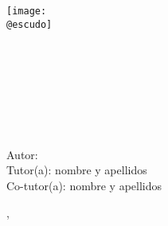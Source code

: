 \begin{titlepage}
    \makeatletter
	\begin{center}
        \vspace{1cm}
		\texttt{[image: \\@escudo]}\vspace{1cm}
		
		{\LARGE \textbf{\@instEdu \\[0.5ex]
				\@centroEdu}}\\[0.5cm]
		{\Large \textbf{\@depto}}\\ [1cm]%
		{\large \textbf{\@especialidad}}\\[1.5cm]
		{\LARGE \textbf{\@tipoDoc}}\\[1cm]
		
		{\LARGE \textbf{\@tituloPrimera}}\\ \smallskip%
		\ifdefined\@tituloSegunda{\LARGE \textbf{\@tituloSegunda}}
		\else \phantom{\LARGE Texto fantasma}
		\fi
	\end{center}
	\vfill%
	\begin{flushleft}
		{\Large Autor: \@autor} \\ \bigskip%
		{\Large Tutor(a): nombre y apellidos} \\ \bigskip%
		{\Large Co-tutor(a): nombre y apellidos}
	\end{flushleft}
	\vspace{2cm}%
	\begin{flushright}
		{\Large {}, \@yearTF}
	\end{flushright}
	\cleardoublepage
    \makeatother
\end{titlepage}

